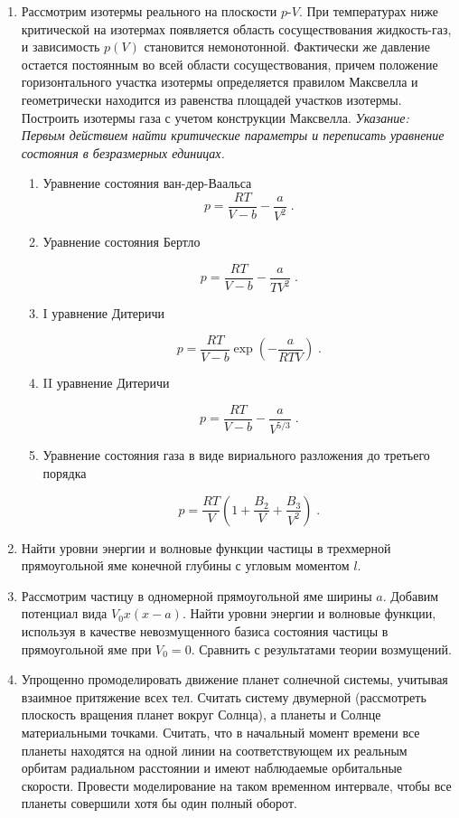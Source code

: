 \documentclass{article}
\begin{document}
\begin{enumerate}
\item Рассмотрим изотермы реального  на плоскости $p$-$V$. При температурах ниже критической на изотермах появляется область сосуществования жидкость-газ, и зависимость $p(V)$ становится немонотонной. Фактически же давление остается постоянным во всей области сосуществования, причем положение горизонтального участка изотермы определяется правилом Максвелла и геометрически находится из равенства площадей участков изотермы. Построить изотермы газа с учетом конструкции Максвелла.
\textit{Указание: Первым действием найти критические параметры и переписать уравнение состояния в безразмерных единицах.}

\begin{enumerate}

\item Уравнение состояния ван-дер-Ваальса
$$
p = \frac{RT}{V - b} - \frac{a}{V^2} \;.
$$

\item Уравнение состояния Бертло

$$
p = \frac{RT}{V - b} - \frac{a}{T V^2} \;.
$$


\item  I уравнение Дитеричи

$$
p = \frac{RT}{V - b}  \exp{\left(-\frac{a}{R T V}\right)} \;.
$$


\item II уравнение Дитеричи

$$
p = \frac{RT}{V - b} - \frac{a}{V^{5/3}} \;.
$$


\item Уравнение состояния газа в виде вириального разложения до третьего порядка

$$
p = \frac{RT}{V} \left( 1 + \frac{B_2}{V} + \frac{B_3}{V^2} \right)\;.
$$


\end{enumerate}


\item Найти уровни энергии и волновые функции частицы в трехмерной прямоугольной яме конечной глубины  с угловым моментом $l$.

\item Рассмотрим частицу в одномерной прямоугольной яме ширины $a$. Добавим потенциал вида $V_0 x (x-a)$. Найти уровни энергии  и волновые функции, используя в качестве невозмущенного базиса состояния частицы в прямоугольной яме при $V_0 = 0$. Сравнить с результатами теории возмущений.


\item Упрощенно промоделировать движение планет солнечной системы, учитывая
взаимное притяжение всех тел. Считать систему двумерной (рассмотреть плоскость
вращения планет вокруг Солнца), а планеты и Солнце материальными точками.
Считать, что в начальный момент времени все планеты находятся на одной линии на
соответствующем их реальным орбитам радиальном расстоянии и имеют наблюдаемые
орбитальные скорости. Провести моделирование на таком временном интервале, чтобы
все планеты совершили хотя бы один полный оборот.


\end{enumerate}
\end{document}
